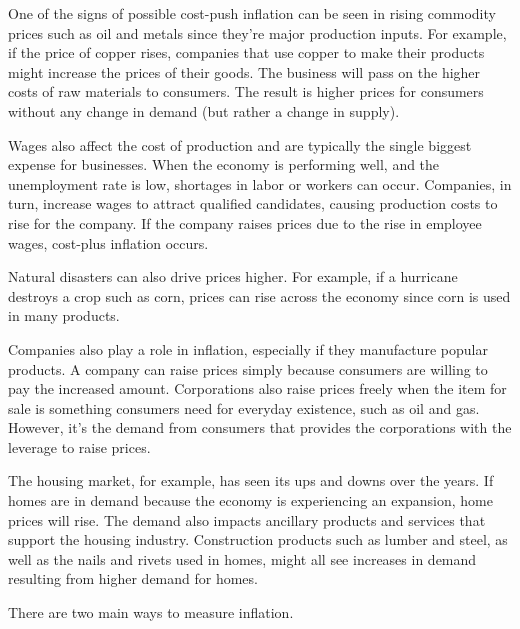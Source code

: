 \documentclass{article}
\begin{document}
  \begin{example}
    One of the signs of possible cost-push inflation can be seen in rising commodity prices such as oil and metals since they're major production inputs. For example, if the price of copper rises, companies that use copper to make their products might increase the prices of their goods. The business will pass on the higher costs of raw materials to consumers. The result is higher prices for consumers without any change in demand (but rather a change in supply). 

    Wages also affect the cost of production and are typically the single biggest expense for businesses. When the economy is performing well, and the unemployment rate is low, shortages in labor or workers can occur. Companies, in turn, increase wages to attract qualified candidates, causing production costs to rise for the company. If the company raises prices due to the rise in employee wages, cost-plus inflation occurs. 

    Natural disasters can also drive prices higher. For example, if a hurricane destroys a crop such as corn, prices can rise across the economy since corn is used in many products.
  \end{example}

  \begin{example}
    Companies also play a role in inflation, especially if they manufacture popular products. A company can raise prices simply because consumers are willing to pay the increased amount. Corporations also raise prices freely when the item for sale is something consumers need for everyday existence, such as oil and gas. However, it's the demand from consumers that provides the corporations with the leverage to raise prices.
  \end{example}

  \begin{example}
    The housing market, for example, has seen its ups and downs over the years. If homes are in demand because the economy is experiencing an expansion, home prices will rise. The demand also impacts ancillary products and services that support the housing industry. Construction products such as lumber and steel, as well as the nails and rivets used in homes, might all see increases in demand resulting from higher demand for homes.
  \end{example}

  There are two main ways to measure inflation. 
\end{document}
